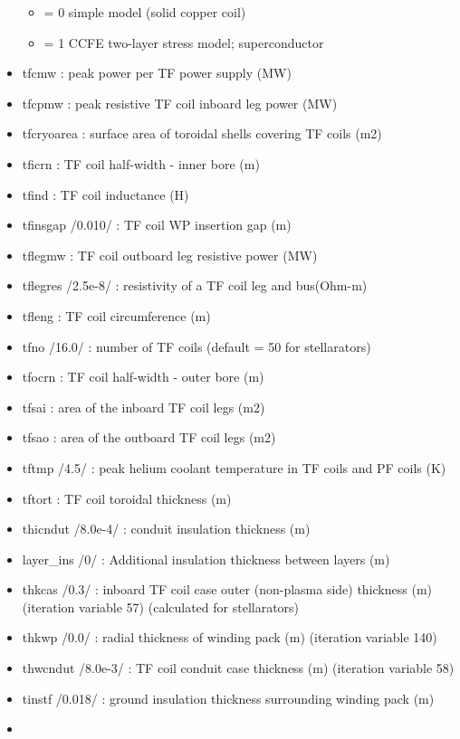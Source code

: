 \documentclass[]{article}
\providecommand{\tightlist}{%
  \setlength{\itemsep}{0pt}\setlength{\parskip}{0pt}}
\begin{document}
\begin{itemize}
  \begin{itemize}
  \tightlist
  \item
    = 0 simple model (solid copper coil)
  \item
    = 1 CCFE two-layer stress model; superconductor
  \end{itemize}
\item
  tfcmw : peak power per TF power supply (MW)
\item
  tfcpmw : peak resistive TF coil inboard leg power (MW)
\item
  tfcryoarea : surface area of toroidal shells covering TF coils (m2)
\item
  tficrn : TF coil half-width - inner bore (m)
\item
  tfind : TF coil inductance (H)
\item
  tfinsgap /0.010/ : TF coil WP insertion gap (m)
\item
  tflegmw : TF coil outboard leg resistive power (MW)
\item
  tflegres /2.5e-8/ : resistivity of a TF coil leg and bus(Ohm-m)
\item
  tfleng : TF coil circumference (m)
\item
  tfno /16.0/ : number of TF coils (default = 50 for stellarators)
\item
  tfocrn : TF coil half-width - outer bore (m)
\item
  tfsai : area of the inboard TF coil legs (m2)
\item
  tfsao : area of the outboard TF coil legs (m2)
\item
  tftmp /4.5/ : peak helium coolant temperature in TF coils and PF coils
  (K)
\item
  tftort : TF coil toroidal thickness (m)
\item
  thicndut /8.0e-4/ : conduit insulation thickness (m)
\item
  layer\_ins /0/ : Additional insulation thickness between layers (m)
\item
  thkcas /0.3/ : inboard TF coil case outer (non-plasma side) thickness
  (m) (iteration variable 57) (calculated for stellarators)
\item
  thkwp /0.0/ : radial thickness of winding pack (m) (iteration variable
  140)
\item
  thwcndut /8.0e-3/ : TF coil conduit case thickness (m) (iteration
  variable 58)
\item
  tinstf /0.018/ : ground insulation thickness surrounding winding pack
  (m)
\item

\end{itemize}
\end{document}
